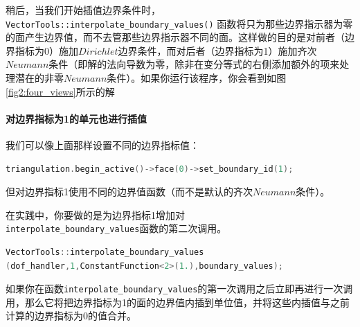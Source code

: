\documentclass[12pt, a4paper]{article}
\numberwithin{equation}{section} %
\begin{document}
稍后，当我们开始插值边界条件时，\\
\verb|VectorTools::interpolate_boundary_values()|
函数将只为那些边界指示器为零的面产生边界值，而不去管那些边界指示器不同的面。这样做的目的是对前者（边界指标为0）施加$Dirichlet$边界条件，而对后者（边界指标为1）施加齐次$Neumann$条件（即解的法向导数为零，除非在变分等式的右侧添加额外的项来处理潜在的非零$Neumann$条件）。如果你运行该程序，你会看到如图\ref{fig2:four_views}所示的解


\paragraph{对边界指标为1的单元也进行插值}

我们可以像上面那样设置不同的边界指标值：
\begin{lstlisting}[language=c]
triangulation.begin_active()->face(0)->set_boundary_id(1);
\end{lstlisting}

但对边界指标1使用不同的边界值函数（而不是默认的齐次$Neumann$条件）。

在实践中，你要做的是为边界指标1增加对\\
\verb|interpolate_boundary_values|函数的第二次调用。
\begin{lstlisting}[language=c]
VectorTools::interpolate_boundary_values
(dof_handler,1,ConstantFunction<2>(1.),boundary_values);
\end{lstlisting}
如果你在函数\verb|interpolate_boundary_values|的第一次调用之后立即再进行一次调用，那么它将把边界指标为1的面的边界值内插到单位值，并将这些内插值与之前计算的边界指标为0的值合并。
\end{document}
